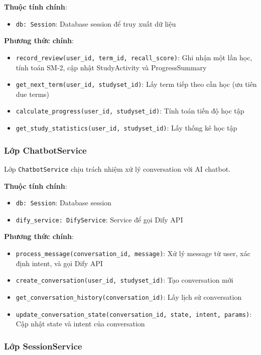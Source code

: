 \documentclass[../DoAn.tex]{subfiles}
\begin{document}
\textbf{Thuộc tính chính}:
\begin{itemize}
    \item \texttt{db: Session}: Database session để truy xuất dữ liệu
\end{itemize}

\textbf{Phương thức chính}:
\begin{itemize}
    \item \texttt{record\_review(user\_id, term\_id, recall\_score)}: Ghi nhận một lần học, tính toán SM-2, cập nhật StudyActivity và ProgressSummary
    \item \texttt{get\_next\_term(user\_id, studyset\_id)}: Lấy term tiếp theo cần học (ưu tiên due terms)
    \item \texttt{calculate\_progress(user\_id, studyset\_id)}: Tính toán tiến độ học tập
    \item \texttt{get\_study\_statistics(user\_id, studyset\_id)}: Lấy thống kê học tập
\end{itemize}

\subsubsection{Lớp ChatbotService}

Lớp \texttt{ChatbotService} chịu trách nhiệm xử lý conversation với AI chatbot.

\textbf{Thuộc tính chính}:
\begin{itemize}
    \item \texttt{db: Session}: Database session
    \item \texttt{dify\_service: DifyService}: Service để gọi Dify API
\end{itemize}

\textbf{Phương thức chính}:
\begin{itemize}
    \item \texttt{process\_message(conversation\_id, message)}: Xử lý message từ user, xác định intent, và gọi Dify API
    \item \texttt{create\_conversation(user\_id, studyset\_id)}: Tạo conversation mới
    \item \texttt{get\_conversation\_history(conversation\_id)}: Lấy lịch sử conversation
    \item \texttt{update\_conversation\_state(conversation\_id, state, intent, params)}: Cập nhật state và intent của conversation
\end{itemize}

\subsubsection{Lớp SessionService}
\end{document}
